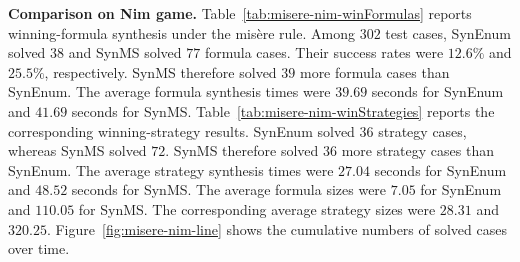 \documentclass[review]{elsarticle}
\begin{document}
{\color{red}
\textbf{Comparison on Nim game.}
Table~\ref{tab:misere-nim-winFormulas} reports winning-formula synthesis under the mis\`{e}re rule.
Among $302$ test cases, SynEnum solved $38$ and SynMS solved $77$ formula cases.
Their success rates were $12.6\%$ and $25.5\%$, respectively.
SynMS therefore solved $39$ more formula cases than SynEnum.
The average formula synthesis times were $39.69$ seconds for SynEnum and $41.69$ seconds for SynMS.
Table~\ref{tab:misere-nim-winStrategies} reports the corresponding winning-strategy results.
SynEnum solved $36$ strategy cases, whereas SynMS solved $72$.
SynMS therefore solved $36$ more strategy cases than SynEnum.
The average strategy synthesis times were $27.04$ seconds for SynEnum and $48.52$ seconds for SynMS.
The average formula sizes were $7.05$ for SynEnum and $110.05$ for SynMS.
The corresponding average strategy sizes were $28.31$ and $320.25$.
Figure~\ref{fig:misere-nim-line} shows the cumulative numbers of solved cases over time.
}
\end{document}
